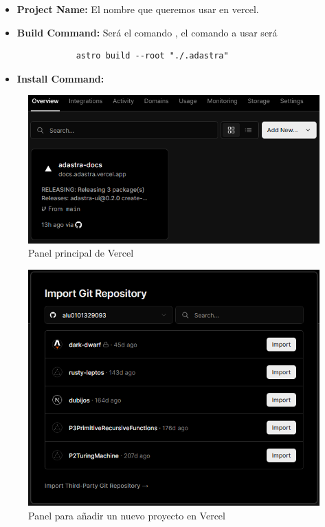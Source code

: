 \begin{itemize}
    \item \textbf{Project Name:} El nombre que queremos usar en vercel.
    \item \textbf{Build Command:} Será el comando , el comando a usar será 
        \begin{verbatim}
            astro build --root "./.adastra"
        \end{verbatim}
    \item \textbf{Install Command:}
\end{itemize}

\begin{figure}
    \centering
    \includegraphics{images/vercelPanel.png}
    \caption{Panel principal de Vercel}
    \label{fig:vercelPanel}
\end{figure}

\begin{figure}
    \centering
    \includegraphics{images/vercelNewProject.png}
    \caption{Panel para añadir un nuevo proyecto en Vercel}
    \label{fig:vercelNewProject}
\end{figure}

